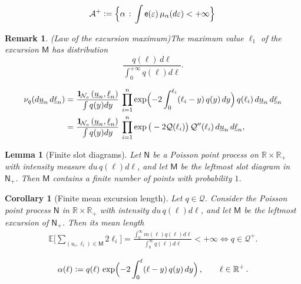 \documentclass[10pt,a4paper]{amsart}
\newtheorem{remark}{Remark}
\newtheorem{lemma}{Lemma}
\newtheorem{corollary}{Corollary}
\newcommand{\EE}{\mathbb E}
\newcommand{\RR}{\mathbb R}
\newcommand{\one}{{\bf 1}\hskip-.5mm} %
\newcommand{\sM}{\mathsf{M}}
\newcommand{\sN}{\mathsf{N}}
\newcommand{\se}{{\mathsf{e}}}
\newcommand{\uell}{\underline \ell}
\newcommand{\uu}{\underline u}
\begin{document}
\begin{equation}
	\label{mua2}
	\mathcal A^+\vcentcolon =\Bigl\{\alpha\,:\,\int \se(\varepsilon)\,\mu_\alpha(d\varepsilon)< +\infty\Bigr\}\,
\end{equation}

\begin{remark}(Law of the excursion maximum)\label{maxi}
The maximum value $\ell_1$ of the excursion $\sM$ has distribution
\begin{equation}\label{maxlaw}
 \frac{q(\ell)\,d\ell}{\int_0^{+\infty} q(\ell)d\ell}.
\end{equation}
\end{remark}

\begin{align}
	\label{nuq5}
	\nu_q(d\uu_n\, d\uell_n) &= \frac{\one_{\mathcal N_o}\left(\underline u_n, \underline \ell_n\right)}{\int q(y)dy}\, \prod_{i=1}^n \exp\Bigl(-2\int_0^{\ell_i} (\ell_i-y)\, q(y)\, dy\Bigr)\, q(\ell_i)\, d\uu_n\, d\uell_n \notag\\
	&= \frac{\one_{\mathcal N_o}\left(\underline u_n, \underline \ell_n\right)}{\int q(y)dy}\, \prod_{i=1}^n \exp\big(-2\mathcal Q(\ell_i)\big)\, \mathcal Q''(\ell_i)\, d\uu_n\, d\uell_n ,
\end{align}

\begin{lemma}[Finite slot diagrams]\label{Tpos}
Let $\sN$ be a Poisson point process on $\RR\times \RR_+$ with intensity measure $du\,q(\ell) d\ell$, and let $\sM$ be the leftmost slot diagram in $\sN_+$. Then $\sM$ contains a finite number of points with probability $1$.
\end{lemma}

\begin{corollary}[Finite mean excursion length]\label{mlength}
Let $q\in \mathscr Q$. Consider the Poisson point process $\sN$ in $\RR\times \RR_+$ with intensity $du\, q(\ell)d\ell$, and let $\sM$ be the leftmost excursion of $\sN_+$. Then its mean length
\begin{align}\label{3133}
\EE\big[ \sum_{(u_i,\ell_i) \in \sM}2\ell_i\big]=\frac{\int_0^\infty m(\ell) q(\ell) d\ell}{\int_0^\infty q(\ell) d\ell}<+\infty \iff q\in \mathscr Q^+.
\end{align}
\end{corollary}

	\begin{align}
		\label{a=q}
		\alpha(\ell) \vcentcolon= q(\ell)\, \exp\Bigl(-2\int_0^\ell(\ell-y)\, q(y)\, dy\Bigr)\,, \qquad \ell\in \mathbb R^+\,.
	\end{align}
\end{document}
